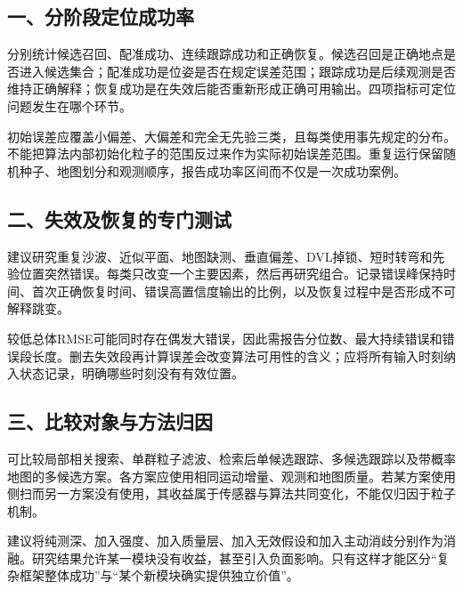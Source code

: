 \hypertarget{ux4e00ux5206ux9636ux6bb5ux5b9aux4f4dux6210ux529fux7387}{%
\subsection{一、分阶段定位成功率}\label{ux4e00ux5206ux9636ux6bb5ux5b9aux4f4dux6210ux529fux7387}}

分别统计候选召回、配准成功、连续跟踪成功和正确恢复。候选召回是正确地点是否进入候选集合；配准成功是位姿是否在规定误差范围；跟踪成功是后续观测是否维持正确解释；恢复成功是在失效后能否重新形成正确可用输出。四项指标可定位问题发生在哪个环节。

初始误差应覆盖小偏差、大偏差和完全无先验三类，且每类使用事先规定的分布。不能把算法内部初始化粒子的范围反过来作为实际初始误差范围。重复运行保留随机种子、地图划分和观测顺序，报告成功率区间而不仅是一次成功案例。

\hypertarget{ux4e8cux5931ux6548ux53caux6062ux590dux7684ux4e13ux95e8ux6d4bux8bd5}{%
\subsection{二、失效及恢复的专门测试}\label{ux4e8cux5931ux6548ux53caux6062ux590dux7684ux4e13ux95e8ux6d4bux8bd5}}

建议研究重复沙波、近似平面、地图缺测、垂直偏差、DVL掉锁、短时转弯和先验位置突然错误。每类只改变一个主要因素，然后再研究组合。记录错误峰保持时间、首次正确恢复时间、错误高置信度输出的比例，以及恢复过程中是否形成不可解释跳变。

较低总体RMSE可能同时存在偶发大错误，因此需报告分位数、最大持续错误和错误段长度。删去失效段再计算误差会改变算法可用性的含义；应将所有输入时刻纳入状态记录，明确哪些时刻没有有效位置。

\hypertarget{ux4e09ux6bd4ux8f83ux5bf9ux8c61ux4e0eux65b9ux6cd5ux5f52ux56e0}{%
\subsection{三、比较对象与方法归因}\label{ux4e09ux6bd4ux8f83ux5bf9ux8c61ux4e0eux65b9ux6cd5ux5f52ux56e0}}

可比较局部相关搜索、单群粒子滤波、检索后单候选跟踪、多候选跟踪以及带概率地图的多候选方案。各方案应使用相同运动增量、观测和地图质量。若某方案使用侧扫而另一方案没有使用，其收益属于传感器与算法共同变化，不能仅归因于粒子机制。

建议将纯测深、加入强度、加入质量层、加入无效假设和加入主动消歧分别作为消融。研究结果允许某一模块没有收益，甚至引入负面影响。只有这样才能区分``复杂框架整体成功''与``某个新模块确实提供独立价值''。

